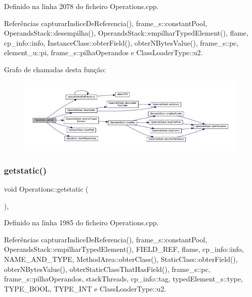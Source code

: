 Definido na linha 2078 do ficheiro Operations.\+cpp.



Referências capturar\+Indice\+De\+Referencia(), frame\+\_\+s\+::constant\+Pool, Operands\+Stack\+::desempilha(), Operands\+Stack\+::empilhar\+Typed\+Element(), flame, cp\+\_\+info\+::info, Instance\+Class\+::obter\+Field(), obter\+N\+Bytes\+Value(), frame\+\_\+s\+::pc, element\+\_\+u\+::pi, frame\+\_\+s\+::pilha\+Operandos e Class\+Loader\+Type\+::u2.

Grafo de chamadas desta função\+:
\nopagebreak
\begin{figure}[H]
\begin{center}
\leavevmode
\includegraphics[width=350pt]{classOperations_a0bb399fe0f64dc21699132c092560e19_cgraph}
\end{center}
\end{figure}
\mbox{\label{classOperations_a0514422a81aa3efa5cb8b3bd1a505a68}} 
\subsubsection{\texorpdfstring{getstatic()}{getstatic()}}
{\footnotesize\ttfamily void Operations\+::getstatic (\begin{DoxyParamCaption}{ }\end{DoxyParamCaption})\hspace{0.3cm}{\ttfamily [static]}, {\ttfamily [private]}}



Definido na linha 1985 do ficheiro Operations.\+cpp.



Referências capturar\+Indice\+De\+Referencia(), frame\+\_\+s\+::constant\+Pool, Operands\+Stack\+::empilhar\+Typed\+Element(), F\+I\+E\+L\+D\+\_\+\+R\+EF, flame, cp\+\_\+info\+::info, N\+A\+M\+E\+\_\+\+A\+N\+D\+\_\+\+T\+Y\+PE, Method\+Area\+::obter\+Class(), Static\+Class\+::obter\+Field(), obter\+N\+Bytes\+Value(), obter\+Static\+Class\+That\+Has\+Field(), frame\+\_\+s\+::pc, frame\+\_\+s\+::pilha\+Operandos, stack\+Threads, cp\+\_\+info\+::tag, typed\+Element\+\_\+s\+::type, T\+Y\+P\+E\+\_\+\+B\+O\+OL, T\+Y\+P\+E\+\_\+\+I\+NT e Class\+Loader\+Type\+::u2.

